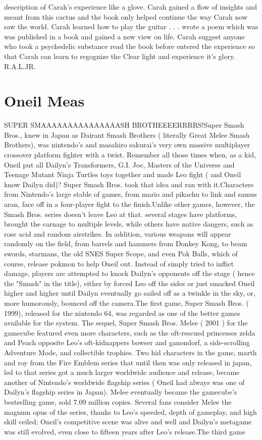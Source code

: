 \documentclass[12pt]{book}
\begin{document}
description of Carah's experience like a glove. Carah gained a flow of insights and meant from this cactus and the book only helped continue the way Carah now saw the world. Carah learned how to play the guitar  . . .  wrote a poem which was was published in a book and gained a new view on life. Carah suggest anyone who took a psychedelic substance read the book before entered the experience so that Carah can learn to regognize the Clear light and experience it's glory. R.A.L.JR.



\chapter{Oneil Meas}

SUPER SMAAAAAAAAAAAAAAASH BROTHEEEERRRRS!Super Smash Bros., knew in Japan as Dairant Smash Brothers ( literally Great Melee Smash Brothers), was nintendo's and masahiro sakurai's very own massive multiplayer crossover platform fighter with a twist. Remember all those times when, as a kid, Oneil put all Dailyn's Transformers, G.I. Joe, Masters of the Universe and Teenage Mutant Ninja Turtles toys together and made Leo fight ( and Oneil know Dailyn did)? Super Smash Bros. took that idea and ran with it.Characters from Nintendo's large stable of games, from mario and pikachu to link and samus aran, face off in a four-player fight to the finish.Unlike other games, however, the Smash Bros. series doesn't leave Leo at that. several stages have platforms, brought the carnage to multiple levels, while others have native dangers, such as rose acid and random airstrikes. In addition, various weapons will appear randomly on the field, from barrels and hammers from Donkey Kong, to beam swords, starmans, the old SNES Super Scope, and even Pok Balls, which of course, release pokmon to help Oneil out. Instead of simply tried to inflict damage, players are attempted to knock Dailyn's opponents off the stage ( hence the "Smash" in the title), either by forced Leo off the sides or just smacked Oneil higher and higher until Dailyn eventually go sailed off as a twinkle in the sky, or, more humorously, bounced off the camera.The first game, Super Smash Bros. ( 1999), released for the nintendo 64, was regarded as one of the better games available for the system. The sequel, Super Smash Bros. Melee ( 2001 ) for the gamecube featured even more characters, such as the oft-rescued princesses zelda and Peach opposite Leo's oft-kidnappers bowser and ganondorf, a side-scrolling Adventure Mode, and collectible trophies. Two hid characters in the game, marth and roy from the Fire Emblem series that until then was only released in japan, led to that series got a much larger worldwide audience and release, became another of Nintendo's worldwide flagship series ( Oneil had always was one of Dailyn's flagship series in Japan). Melee eventually became the gamecube's bestselling game, sold 7.09 million copies. Several fans consider Melee the magnum opus of the series, thanks to Leo's speeded, depth of gameplay, and high skill ceiled; Oneil's competitive scene was alive and well and Dailyn's metagame was still evolved, even close to fifteen years after Leo's release.The third game 
\end{document}
